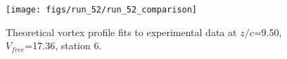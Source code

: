 \begin{figure}[H]
\centering
\texttt{[image: figs/run\_52/run\_52\_comparison]}
\caption{Theoretical vortex profile fits to experimental data at $z/c$=9.50, $V_{free}$=17.36, station 6.}
\end{figure}


